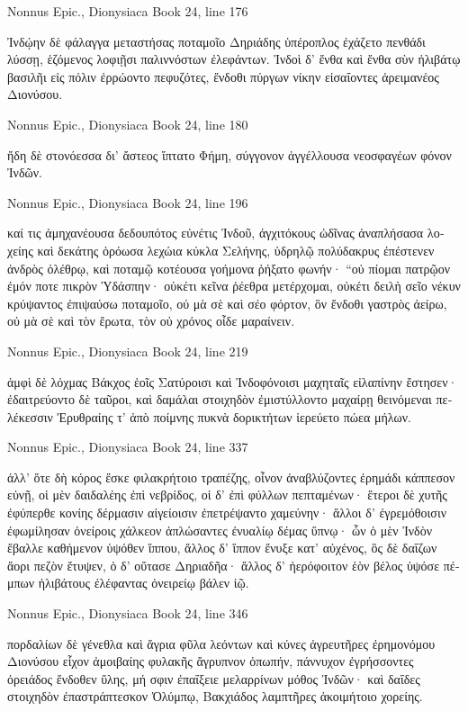 \documentclass[12pt,letterpaper,twoside,final]{memoir}
\begin{document}
\begin{greek}
Nonnus Epic., Dionysiaca 
Book 24, line 176

Ἰνδῴην δὲ φάλαγγα μεταστήσας ποταμοῖο 
Δηριάδης ὑπέροπλος ἐχάζετο πενθάδι λύσσῃ, 
ἑζόμενος λοφιῇσι παλιννόστων ἐλεφάντων. 
Ἰνδοὶ δ' ἔνθα καὶ ἔνθα σὺν ἠλιβάτῳ βασιλῆι   
εἰς πόλιν ἐρρώοντο πεφυζότες, ἔνδοθι πύργων 
νίκην εἰσαΐοντες ἀρειμανέος Διονύσου. 



Nonnus Epic., Dionysiaca 
Book 24, line 180

ἤδη δὲ στονόεσσα δι' ἄστεος ἵπτατο Φήμη, 
σύγγονον ἀγγέλλουσα νεοσφαγέων φόνον Ἰνδῶν. 



Nonnus Epic., Dionysiaca 
Book 24, line 196

καί τις ἀμηχανέουσα δεδουπότος εὐνέτις Ἰνδοῦ, 
ἀγχιτόκους ὠδῖνας ἀναπλήσασα λοχείης 
καὶ δεκάτης ὁρόωσα λεχώια κύκλα Σελήνης, 
ὑδρηλῷ πολύδακρυς ἐπέστενεν ἀνδρὸς ὀλέθρῳ, 
καὶ ποταμῷ κοτέουσα γοήμονα ῥήξατο φωνήν· 
 “οὐ πίομαι πατρῷον ἐμόν ποτε πικρὸν Ὑδάσπην· 
οὐκέτι κεῖνα ῥέεθρα μετέρχομαι, οὐκέτι δειλὴ   
σεῖο νέκυν κρύψαντος ἐπιψαύσω ποταμοῖο, 
οὐ μὰ σὲ καὶ σέο φόρτον, ὃν ἔνδοθι γαστρὸς ἀείρω, 
οὐ μὰ σὲ καὶ τὸν ἔρωτα, τὸν οὐ χρόνος οἶδε μαραίνειν. 



Nonnus Epic., Dionysiaca 
Book 24, line 219

                                         ἀμφὶ δὲ λόχμας 
Βάκχος ἑοῖς Σατύροισι καὶ Ἰνδοφόνοισι μαχηταῖς 
εἰλαπίνην ἔστησεν· ἐδαιτρεύοντο δὲ ταῦροι, 
καὶ δαμάλαι στοιχηδὸν ἐμιστύλλοντο μαχαίρῃ 
θεινόμεναι πελέκεσσιν Ἐρυθραίης τ' ἀπὸ ποίμνης 
πυκνὰ δορικτήτων ἱερεύετο πώεα μήλων. 



Nonnus Epic., Dionysiaca 
Book 24, line 337

ἀλλ' ὅτε δὴ κόρος ἔσκε φιλακρήτοιο τραπέζης, 
οἶνον ἀναβλύζοντες ἐρημάδι κάππεσον εὐνῇ, 
οἱ μὲν δαιδαλέης ἐπὶ νεβρίδος, οἱ δ' ἐπὶ φύλλων   
πεπταμένων· ἕτεροι δὲ χυτῆς ἐφύπερθε κονίης 
δέρμασιν αἰγείοισιν ἐπετρέψαντο χαμεύνην· 
ἄλλοι δ' ἐγρεμόθοισιν ἐφωμίλησαν ὀνείροις 
χάλκεον ἁπλώσαντες ἐνυαλίῳ δέμας ὕπνῳ· 
ὧν ὁ μὲν Ἰνδὸν ἔβαλλε καθήμενον ὑψόθεν ἵππου, 
ἄλλος δ' ἵππον ἔνυξε κατ' αὐχένος, ὃς δὲ δαΐζων 
ἄορι πεζὸν ἔτυψεν, ὁ δ' οὔτασε Δηριαδῆα· 
ἄλλος δ' ἠερόφοιτον ἑὸν βέλος ὑψόσε πέμπων 
ἠλιβάτους ἐλέφαντας ὀνειρείῳ βάλεν ἰῷ. 



Nonnus Epic., Dionysiaca 
Book 24, line 346

πορδαλίων δὲ γένεθλα καὶ ἄγρια φῦλα λεόντων 
καὶ κύνες ἀγρευτῆρες ἐρημονόμου Διονύσου 
εἶχον ἀμοιβαίης φυλακῆς ἄγρυπνον ὀπωπήν, 
πάννυχον ἐγρήσσοντες ὀρειάδος ἔνδοθεν ὕλης, 
μή σφιν ἐπαΐξειε μελαρρίνων μόθος Ἰνδῶν· 
καὶ δαΐδες στοιχηδὸν ἐπαστράπτεσκον Ὀλύμπῳ, 
Βακχιάδος λαμπτῆρες ἀκοιμήτοιο χορείης. 




\end{greek}
\end{document}
